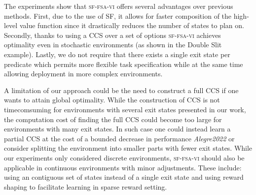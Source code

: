 The experiments show that \textsc{sf-fsa-vi} offers several advantages over previous methods. First, due to the use of SF, it allows for faster composition of the high-level value function since it drastically reduces the number of states to plan on. Secondly, thanks to using a CCS over a set of options \textsc{sf-fsa-vi} achieves optimality even in stochastic environments (as shown in the Double Slit example). Lastly, we do not require that there exists a single exit state per predicate which permits more flexible task specification while at the same time allowing deployment in more complex environments. 

A limitation of our approach could be the need to construct a full CCS if one wants to attain global optimality. While the construction of CCS is not timecomsuming for environments with several exit states presented in our work, the computation cost of finding the full CCS could become too large for environments with many exit states. In such case one could instead learn a partial CCS at the cost of a bounded decrease in performance \textit{Alegre2022} or consider splitting the environment into smaller parts with fewer exit states. While our experiments only considered discrete environments, \textsc{sf-fsa-vi} should also be applicable in continuous environments with minor adjustments. These include: using an contiguous set of states instead of a single exit state and using reward shaping to facilitate learning in sparse reward setting.